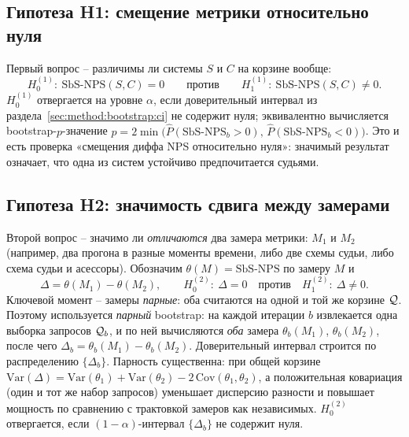 \subsection{Гипотеза H1: смещение метрики относительно нуля}
\label{sec:method:bootstrap:h1}

Первый вопрос -- различимы ли системы $S$ и $C$ на корзине вообще:
\begin{equation}
    \label{eq:h1}
    H_0^{(1)}:\ \mathrm{SbS\text{-}NPS}(S, C) = 0
    \qquad \text{против} \qquad
    H_1^{(1)}:\ \mathrm{SbS\text{-}NPS}(S, C) \neq 0.
\end{equation}
$H_0^{(1)}$ отвергается на уровне $\alpha$, если доверительный интервал
из раздела~\ref{sec:method:bootstrap:ci} не содержит нуля; эквивалентно
вычисляется bootstrap-$p$-значение
$p = 2\min\!\big(\hat{P}(\mathrm{SbS\text{-}NPS}_b > 0),\,
\hat{P}(\mathrm{SbS\text{-}NPS}_b < 0)\big)$.
Это и есть проверка «смещения диффа NPS относительно нуля»: значимый
результат означает, что одна из систем устойчиво предпочитается судьями.

\subsection{Гипотеза H2: значимость сдвига между замерами}
\label{sec:method:bootstrap:h2}

Второй вопрос -- значимо ли \emph{отличаются} два замера метрики:
$M_1$ и $M_2$ (например, два прогона в разные моменты времени, либо две
схемы судьи, либо схема судьи и асессоры). Обозначим
$\theta(M) = \mathrm{SbS\text{-}NPS}$ по замеру $M$ и
\begin{equation}
    \label{eq:h2}
    \Delta = \theta(M_1) - \theta(M_2),
    \qquad
    H_0^{(2)}:\ \Delta = 0
    \quad \text{против} \quad
    H_1^{(2)}:\ \Delta \neq 0.
\end{equation}
Ключевой момент -- замеры \emph{парные}: оба считаются на одной и той же
корзине $\mathcal{Q}$. Поэтому используется \emph{парный} bootstrap: на каждой
итерации $b$ извлекается одна выборка запросов $\mathcal{Q}_b$, и по ней
вычисляются \emph{оба} замера $\theta_b(M_1)$, $\theta_b(M_2)$, после чего
$\Delta_b = \theta_b(M_1) - \theta_b(M_2)$.
Доверительный интервал строится по распределению $\{\Delta_b\}$.
Парность существенна: при общей корзине
$\mathrm{Var}(\Delta) = \mathrm{Var}(\theta_1) + \mathrm{Var}(\theta_2)
- 2\,\mathrm{Cov}(\theta_1, \theta_2)$, а положительная ковариация
(один и тот же набор запросов) уменьшает дисперсию разности и повышает
мощность по сравнению с трактовкой замеров как независимых.
$H_0^{(2)}$ отвергается, если $(1-\alpha)$-интервал $\{\Delta_b\}$ не
содержит нуля.

